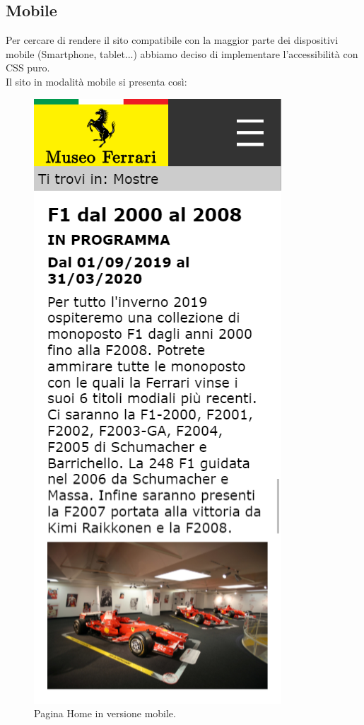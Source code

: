 \subsection{Mobile}
Per cercare di rendere il sito compatibile con la maggior parte dei dispositivi mobile (Smartphone, tablet...)
abbiamo deciso di implementare l'accessibilità con CSS puro.\\
Il sito in modalità mobile si presenta così:
\begin{figure}[H]
	\begin{center}
		\includegraphics[scale=.3]{Images/home_mobile.png}
		\caption{Pagina Home in versione mobile.}
	\end{center}
\end{figure}
